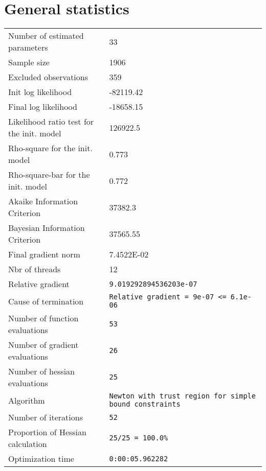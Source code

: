 



\section{General statistics}
\begin{tabular}{ll}
Number of estimated parameters & 33 \\
Sample size & 1906 \\
Excluded observations & 359 \\
Init log likelihood & -82119.42 \\
Final log likelihood & -18658.15 \\
Likelihood ratio test for the init. model & 126922.5 \\
Rho-square for the init. model & 0.773 \\
Rho-square-bar for the init. model & 0.772 \\
Akaike Information Criterion & 37382.3 \\
Bayesian Information Criterion & 37565.55 \\
Final gradient norm & 7.4522E-02 \\
Nbr of threads & 12 \\
Relative gradient & \verb$9.019292894536203e-07$ \\
Cause of termination & \verb$Relative gradient = 9e-07 <= 6.1e-06$ \\
Number of function evaluations & \verb$53$ \\
Number of gradient evaluations & \verb$26$ \\
Number of hessian evaluations & \verb$25$ \\
Algorithm & \verb$Newton with trust region for simple bound constraints$ \\
Number of iterations & \verb$52$ \\
Proportion of Hessian calculation & \verb$25/25 = 100.0%$ \\
Optimization time & \verb$0:00:05.962282$ \\
\end{tabular}

